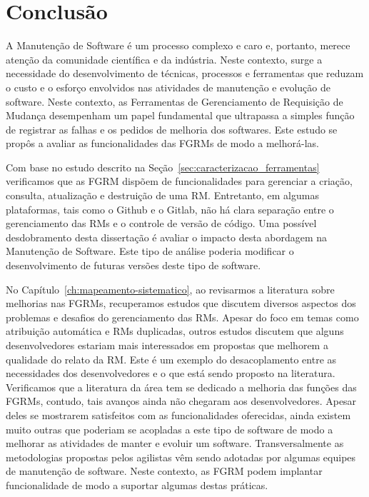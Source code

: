 \chapter{Conclusão}
\label{ch:conclusao_trab_futuros}

A Manutenção de Software é um processo complexo e caro e, portanto, merece
atenção da comunidade científica e da indústria. Neste contexto, surge a
necessidade do desenvolvimento de técnicas, processos e ferramentas que reduzam
o custo e o esforço envolvidos nas atividades de manutenção e evolução de
software. Neste contexto, as Ferramentas de Gerenciamento de Requisição de
Mudança desempenham um papel fundamental que ultrapassa a simples função de
registrar as falhas e os pedidos de melhoria dos softwares. Este estudo se
propôs a avaliar as funcionalidades das FGRMs de modo a melhorá-las.

Com base no estudo descrito na Seção~\ref{sec:caracterizacao_ferramentas}
verificamos que as FGRM dispõem de funcionalidades para gerenciar a criação,
consulta, atualização e destruição de uma RM\@. Entretanto, em algumas
plataformas, tais como o Github e o Gitlab, não há clara separação entre o
gerenciamento das RMs e o controle de versão de código. Uma possível
desdobramento desta dissertação é avaliar o impacto desta abordagem na
Manutenção de Software. Este tipo de análise poderia modificar o desenvolvimento
de futuras versões deste tipo de software.

No Capítulo~\ref{ch:mapeamento-sistematico}, ao revisarmos a literatura sobre
melhorias nas FGRMs, recuperamos estudos que discutem diversos aspectos dos
problemas e desafios do gerenciamento das RMs. Apesar do foco em temas como
atribuição automática e RMs duplicadas, outros estudos discutem que alguns
desenvolvedores estariam mais interessados em propostas que melhorem a qualidade
do relato da RM\@. Este é um exemplo do desacoplamento entre as necessidades dos
desenvolvedores e o que está sendo proposto na literatura. Verificamos que a
literatura da área tem se dedicado a melhoria das funções das FGRMs, contudo,
tais avanços ainda não chegaram aos desenvolvedores. Apesar deles se mostrarem
satisfeitos com as funcionalidades oferecidas, ainda existem muito outras que
poderiam se acopladas a este tipo de software de modo a melhorar as atividades
de manter e evoluir um software. Transversalmente as metodologias propostas
pelos agilistas vêm sendo adotadas por algumas equipes de manutenção de
software. Neste contexto, as FGRM podem implantar funcionalidade de modo a
suportar algumas destas práticas.

